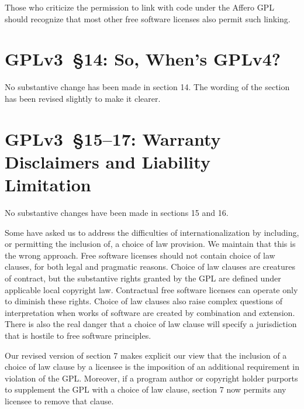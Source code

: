 Those who criticize the permission to link with code under the Affero
GPL should recognize that most other free software licenses also permit
such linking. 

\section{GPLv3~\S14: So, When's GPLv4?}
\label{GPlv2s14}


No substantive change has been made in section 14. The wording of the section
has been revised slightly to make it clearer.


\section{GPLv3~\S15--17: Warranty Disclaimers and Liability Limitation}

No substantive changes have been made in sections 15 and 16.




Some have asked us to address the difficulties of internationalization
by including, or permitting the inclusion of, a choice of law
provision.  We maintain that this is the wrong approach.  Free
software licenses should not contain choice of law clauses, for both
legal and pragmatic reasons.  Choice of law clauses are creatures of
contract, but the substantive rights granted by the GPL are defined
under applicable local copyright law. Contractual free software
licenses can operate only to diminish these rights.  Choice of law
clauses also raise complex questions of interpretation when works of
software are created by combination and extension.  There is also the
real danger that a choice of law clause will specify a jurisdiction
that is hostile to free software principles.


Our revised version of section 7 makes explicit our view that the
inclusion of a choice of law clause by a licensee is the imposition of
an additional requirement in violation of the GPL.  Moreover, if a
program author or copyright holder purports to supplement the GPL with
a choice of law clause, section 7 now permits any licensee to remove
that clause.


